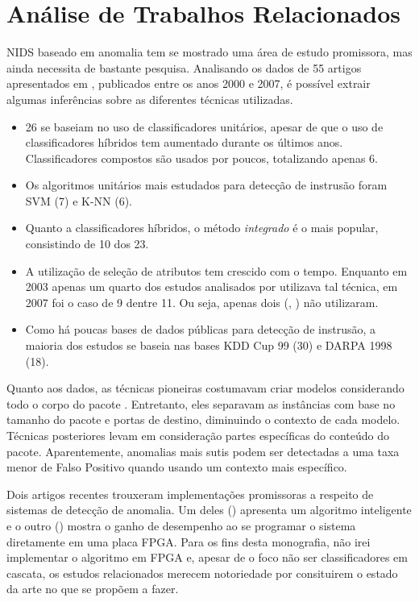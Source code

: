 \chapter{Análise de Trabalhos Relacionados}
\label{ch:analise}

NIDS baseado em anomalia tem se mostrado uma área de estudo promissora, mas ainda necessita de bastante pesquisa.
Analisando os dados de 55 artigos apresentados em \cite{tsai09}, publicados entre os anos 2000 e 2007,
é possível extrair algumas inferências sobre as diferentes técnicas utilizadas.
\begin{itemize}
    \item  26 se baseiam no uso de classificadores unitários, apesar de que o uso de
    classificadores híbridos tem aumentado durante os últimos anos.
    Classificadores compostos são usados por poucos, totalizando apenas 6.

    \item Os algoritmos unitários mais estudados para detecção de instrusão foram SVM (7) e K-NN (6).

    \item Quanto a classificadores híbridos, o método \textit{integrado} é o mais popular, consistindo de 10 dos 23.

    \item A utilização de seleção de atributos tem crescido com o tempo. Enquanto em 2003 apenas um quarto dos estudos analisados
por \cite{tsai09} utilizava tal técnica, em 2007 foi o caso de 9 dentre 11. Ou seja, apenas dois (\cite{peddabachigari07}, \cite{li07}) não utilizaram.

    \item Como há poucas bases de dados públicas para detecção de instrusão, a maioria dos estudos se baseia nas
    bases KDD Cup 99 (30) e DARPA 1998 (18).
\end{itemize}

\par Quanto aos dados, as técnicas pioneiras costumavam criar modelos considerando todo o corpo do pacote . Entretanto,
eles separavam as instâncias com base no tamanho do pacote e portas de destino, diminuindo o contexto de cada modelo.
Técnicas posteriores levam em consideração partes específicas do conteúdo do pacote. Aparentemente, anomalias mais
sutis podem ser detectadas a uma taxa menor de Falso Positivo quando usando um contexto mais específico.
\par Dois artigos recentes trouxeram implementações promissoras a respeito de sistemas de detecção de
anomalia. Um deles (\cite{lin12}) apresenta um algoritmo inteligente e o outro (\cite{papadonikolakis12}) mostra o
ganho de desempenho ao se programar o sistema diretamente em uma placa FPGA. Para os fins desta monografia, não irei
implementar o algoritmo em FPGA e, apesar de o foco não ser classificadores em cascata, os estudos relacionados merecem
notoriedade por consituirem o estado da arte no que se propõem a fazer.

